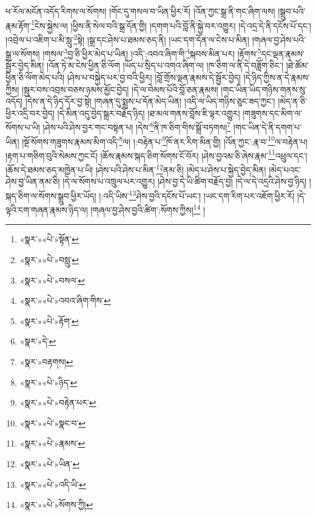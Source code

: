 ཕ་རོལ་མངོན་འདོད་རིགས་ལ་སོགས། །གོང་དུ་གསལ་བ་ཡིན་ཕྱིར་རོ། །འོན་ཀྱང་སྒྲ་ནི་གང་ཞིག་ལས། །སྒྲུབ་པའི་རྣམ་རྟོག་\footnote{«སྣར་»«པེ་»སྟོན་}ངེས་སྐྱེས་ལ། །ཕྱིས་ནི་སེལ་བའི་སྒྲ་དོན་གྱི། །དགག་པའི་བློ་ནི་སྐྱེ་བར་འགྱུར། །དེ་འདྲ་དེ་ནི་དངོས་པོ་དང་། །འབྲེལ་པ་འཇིག་པ་མི་སླུ་\footnote{«སྣར་»«པེ་»བསླུ་}སྟེ། །སྒྲ་དང་ཤེས་པ་ཐམས་ཅད་ནི། །ཡང་དག་དོན་ལ་ངེས་པ་མིན། །གཞལ་བྱ་ཤེས་པའི་སྒྲ་ལ་སོགས། །གསལ་\footnote{«སྣར་»«པེ་»བསལ་}བྱ་ཅི་ཕྱིར་མེད་པ་ཡིན། །འདི་:འབའ་ཞིག་གི་\footnote{«སྣར་»«པེ་»འབའ་ཞིག་གིས་}སྐབས་མིན་པར། །རྟོགས་\footnote{«སྣར་»«པེ་»རྟོག་}དང་ལྡན་རྣམས་སྦྱོར་བྱེད་མིན། །འོན་ཏེ་མ་ངེས་ཕྱིན་ཅི་ལོག །ཡོད་པ་སྲིད་པ་འགའ་ཞིག་ལ། །ཁ་ཅིག་ལ་ནི་དེ་བཟློག་ཅིང་། །ཐེ་ཚོམ་ཕྱིན་ཅི་ལོག་མེད་པའི། །ཤེས་པ་བསྐྱེད་པར་བྱ་བའི་ཕྱིར། །བློ་གྲོས་ལྡན་རྣམས་དེ་སྦྱོར་བྱེད། །དེ་ཉིད་ཀྱིས་ན་དེ་རྣམས་ཀྱིས། །སྦྱར་བས་འབྲས་བཅས་ཉམས་མྱོང་བྱེད། །དེ་ལ་བེམས་པོའི་བློ་ཅན་རྣམས། །གང་ཡིན་ཡིད་གཉིས་གནས་སུ་འདོད། །དེས་ན་དེ་ཉིད་དོར་བྱ་སྟེ། །གཞན་དུ་སྨྲས་པ་དོན་མེད་ཡིན། །འདི་ལ་ཡིད་གཉིས་ཅུང་ཟད་ཀྱང་། །མེད་ན་ཅི་ཕྱིར་འདྲི་བར་བྱེད། །དེ་མིན་འདུ་བྱེད་སྒྲར་བརྗོད་ཉིད། །ཐ་མལ་གནས་བློས་ཇི་ལྟར་འགྱུར། །གཟུགས་དང་མིག་ལ་སོགས་པ་ཡི། །ཤེས་པའི་ཤེས་བྱར་གང་བསྟན་པ། །དེས་\footnote{«སྣར་»དེ་}ནི་ཁ་ཅིག་གིས་སྒྲོ་བཏགས།\footnote{«སྣར་»བརྟགས།} །གང་ཡིན་དེ་ནི་དགག་པ་ཡིན། །སྔོ་སོགས་གཟུགས་རྣམས་མིག་འདི་\footnote{«སྣར་»«པེ་»ཉིད་}ལ། །:བརྟེན་པ་\footnote{«སྣར་»«པེ་»བརྟེན་པར་}ཁོ་ནར་རིག་མིན་གྱི། །འོན་ཀྱང་:རྣ་བ་\footnote{«སྣར་»«པེ་»སྣང་བ་}ལ་བརྟེན་པ། །རྟག་པ་གཅིག་བུའི་སེམས་ཀྱང་ངོ། །ཆོས་རྣམས་སྐད་ཅིག་སོགས་ངོ་བོར། །ཤེས་བྱའམ་ཅི་ཞེས་རྣམ་\footnote{«སྣར་»«པེ་»རྣམས་}འཕྲུལ་དང་། །ཆོས་དེ་ཐམས་ཅད་མཁྱེན་པ་ཡི། །ཤེས་པའི་ཤེས་པ་མིན་\footnote{«སྣར་»«པེ་»ཡིན་}ནམ་ཅི། །མེད་པ་ཤེས་པ་སྐྱེད་བྱེད་མིན། །མེད་པའང་ཤེས་བྱ་ཡིན་ནམ་ཅི། །དེ་ལ་སོགས་པ་འཁྲུལ་པར་འགྱུར། །ཤེས་བྱ་དེ་ཡི་ཚིག་བརྗོད་བྱ། །དེ་ལ་དེ་འདྲའི་ཤེས་བྱ་ཉིད། །སྐད་ཅིག་ལ་སོགས་སྒྲུབ་ཕྱིར་ཡོད། །:འདི་ཡིས་\footnote{«སྣར་»«པེ་»འདི་ཡི་}ཤེས་བྱའི་དངོས་པོ་ཡང་། །ཡང་དག་རིག་པར་འཇོག་ཕྱིར་རོ། །དེ་ལྟའི་ངག་གཞན་རྣམས་ཉིད་ལ། །གཞལ་བྱ་ཤེས་བྱའི་ཚིག་:སོགས་ཀྱིས།\footnote{«སྣར་»«པེ་»སོགས་ཀྱི།} །
